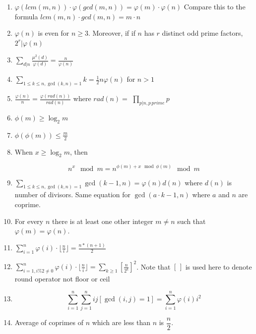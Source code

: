 \begin{enumerate}
\item $\displaystyle \varphi(lcm(m, n)) \cdot \varphi(gcd(m, n))=\varphi(m) \cdot \varphi(n)$  
  Compare this to the formula $lcm(m, n)\cdot gcd(m,n)=m\cdot n$
\item $\displaystyle \varphi(n)$ is even for $n\geq3$. Moreover, if if $n$ has $r$ distinct odd prime factors, $\displaystyle 2^r \vert \varphi(n)$
\item $\displaystyle \sum\limits_{d\vert{n}}^{} \frac{\mu^2(d)}{\varphi(d)}=\frac{n}{\varphi(n)}$
\item $\displaystyle \sum\limits_{1\leq k \leq n, \gcd(k, n)=1}k=\frac{1}{2}n\varphi(n)$ for $n > 1$
\item $\displaystyle \frac{\varphi(n)}{n}=\frac{\varphi(rad(n))}{rad(n)}$ where $rad(n)=$ 
    $\displaystyle \prod\limits_{p\vert n, p \, prime} p$
\item $\displaystyle \phi(m) \geq \log_2{m}$
\item $\displaystyle \phi(\phi(m))\leq\frac{m}{2}$
\item When $\displaystyle x \geq \log_2m$, then 
     
     $$n^x\mod m=n^{\phi(m) + x\mod \phi(m)}\mod m$$
\item $\displaystyle \sum\limits_{1\leq k\leq n, \gcd(k, n)=1}\gcd(k-1, n)=\varphi(n)d(n)$ where $d(n)$ is number of divisors. Same equation for $\displaystyle \gcd(a \cdot k-1, n)$ where $\displaystyle a$ and $n$ are coprime.
\item For every $n$ there is at least one other integer $m\ne n$ such that $\displaystyle \varphi(m)=\varphi(n).$
\item $\displaystyle \sum\limits_{i=1}^{n} {\varphi(i) \cdot \lfloor\frac{n}{i}\rfloor=\frac{n*(n+1)}{2}}$
\item $\displaystyle \sum\limits_{i=1, i \% 2 \ne 0 }^{n} \varphi(i) \cdot \lfloor\frac{n}{i}\rfloor=\sum\limits_{k\geq 1}[\frac{n}{2^k}]^2$.
  Note that $[\, ]$ is used here to denote round operator not floor or ceil
\item $$\displaystyle \sum\limits_{i=1}^{n}\sum\limits_{j=1}^{n}ij[\gcd(i, j)=1]=\sum\limits_{i=1}^{n}\varphi(i)i^2$$
\item Average of coprimes of $n$ which are less than $n$ is $\displaystyle \dfrac{n}{2}$.
\end{enumerate}

